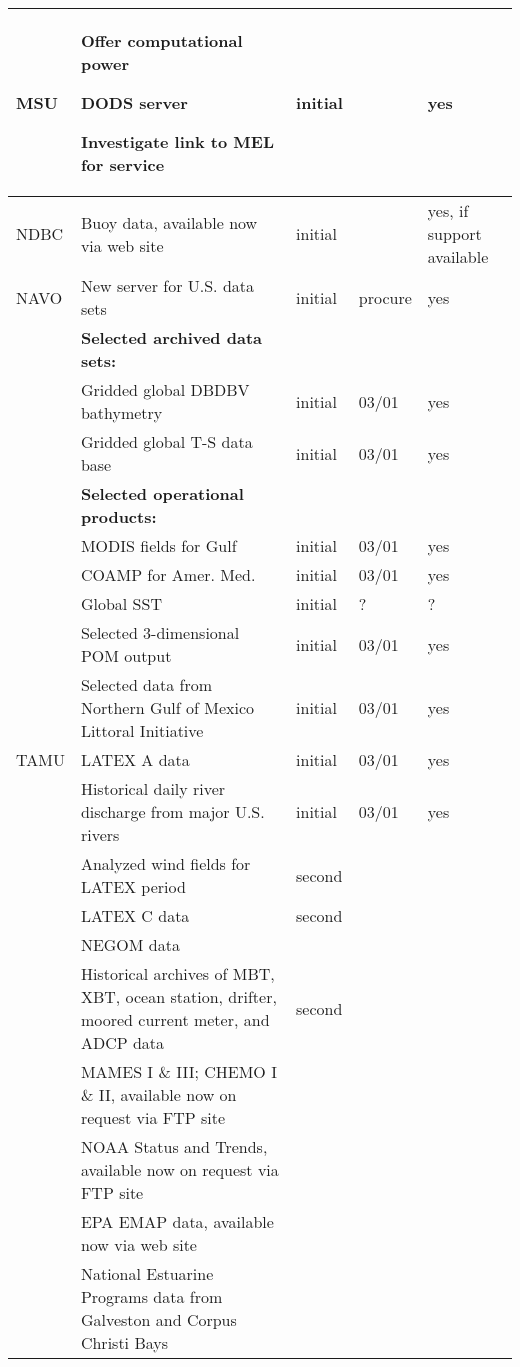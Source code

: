 \begin{longtable}{|p{0.75in}|p{2.75in}|p{0.5in}|p{0.5in}|p{0.5in}|}
MSU 
&
\begin{tablelist}
\item Offer computational power   
\item DODS server
\item Investigate link to MEL for service
\end{tablelist}
&
   initial  & &  yes \\ \hline

NDBC & Buoy data, available now via web site & initial & & yes, if
support available \\ \hline

NAVO &  New server for U.S. data sets  & initial  & procure & yes \\
   &         \textbf{Selected archived data sets:} & & & \\
   &               Gridded global DBDBV bathymetry & initial   &   03/01 &    yes \\
   &       Gridded global T-S data  base  & initial   &   03/01 &    yes \\
&             \textbf{Selected operational products: } & & & \\
&               MODIS fields for Gulf & initial   &   03/01 &    yes \\
&               COAMP for Amer. Med. & initial   &   03/01 &    yes \\
&               Global SST  &                 initial  &      ?    &   ? \\
&             Selected 3-dimensional POM     
               output   & initial  &     03/01 &    yes \\ 
&             Selected data from Northern
               Gulf of Mexico Littoral 
               Initiative  & initial  &     03/01 &    yes \\ \hline
TAMU  &       LATEX A data  & initial  &     03/01 &    yes \\ 
&              Historical daily river 
               discharge from major U.S. 
               rivers & initial & 03/01 & yes \\
&             Analyzed wind fields for 
               LATEX period & second & & \\
&             LATEX C data  & second & & \\
&             NEGOM data & & & \\
&             Historical archives of MBT, 
               XBT, ocean station, drifter, 
               moored current meter, and 
               ADCP data  & second & & \\
&             MAMES I \& III; CHEMO I \& II, 
               available now on request 
               via FTP site & & & \\
&             NOAA Status and Trends, 
               available now on request 
               via FTP site  & & & \\
&             EPA EMAP data, available now 
               via web site  & & & \\
&             National Estuarine Programs 
               data from Galveston and 
               Corpus Christi Bays  & & & \\ \hline


\end{longtable}
